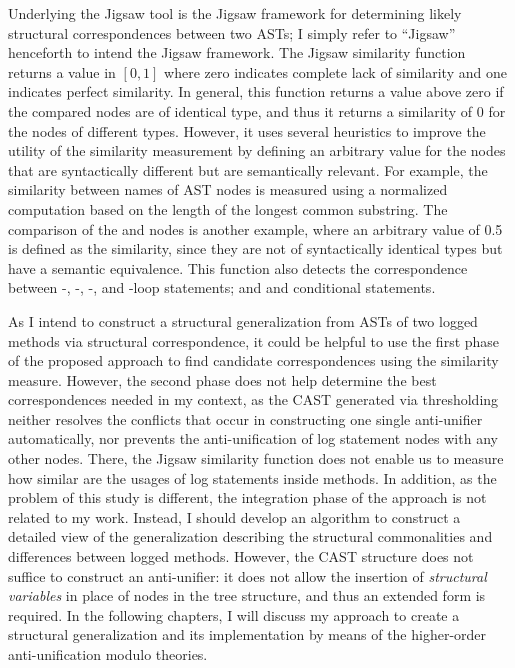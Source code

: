 Underlying the Jigsaw tool is the Jigsaw framework for determining likely structural correspondences between two ASTs; I simply refer to ``Jigsaw'' henceforth to intend the Jigsaw framework.
The Jigsaw similarity function returns a value in $[0, 1]$ where zero indicates complete lack of similarity and one indicates perfect similarity. In general, this function returns a value above zero if the compared nodes are of identical type, and thus it returns a similarity of 0 for the nodes of different types. However, it uses several heuristics to improve the utility of the similarity measurement by defining an arbitrary value for the nodes that are syntactically different but are semantically relevant. For example, the similarity between names of AST nodes is measured using a normalized computation based on the length of the longest common substring. The comparison of the  and  nodes is another example, where an arbitrary value of 0.5 is defined as the similarity, since they are not of syntactically identical types but have a semantic equivalence. This function also detects the correspondence between -, -, -, and -loop statements; and  and  conditional statements.


As I intend to construct a structural generalization from ASTs of two logged methods via structural correspondence, it could be helpful to use the first phase of the proposed approach to find candidate correspondences using the similarity measure. However, the second phase does not help determine the best correspondences needed in my context, as the CAST generated via thresholding neither resolves the conflicts that occur in constructing one single anti-unifier automatically, nor prevents the anti-unification of log statement nodes with any other nodes. There, the Jigsaw similarity function does not enable us to measure how similar are the usages of log statements inside methods. In addition, as the problem of this study is different, the integration phase of the approach is not related to my work. Instead, I should develop an algorithm to construct a detailed view of the generalization describing the structural commonalities and differences between logged methods. However, the CAST structure does not suffice to construct an anti-unifier: it does not allow the insertion of \emph{structural variables} in place of nodes in the tree structure, and thus an extended form is required. In the following chapters, I will discuss my approach to create a structural generalization and its implementation by means of the higher-order anti-unification modulo theories.

